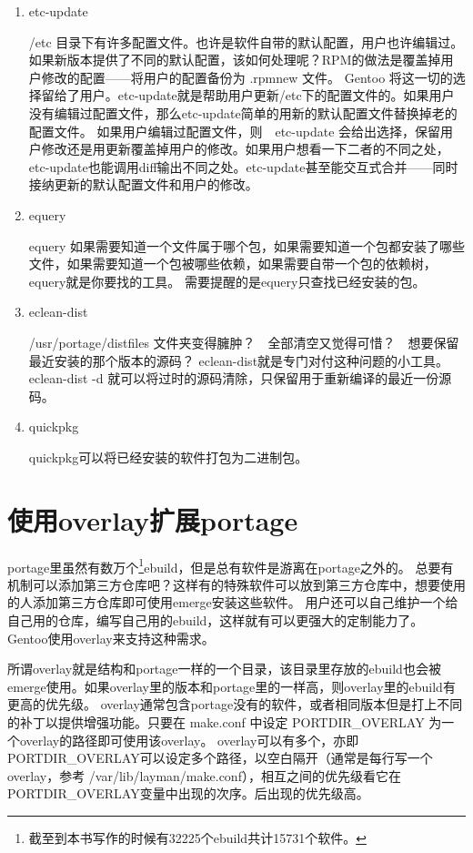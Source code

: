 \begin{enumerate}
\item  etc-update

/etc 目录下有许多配置文件。也许是软件自带的默认配置，用户也许编辑过。如果新版本提供了不同的默认配置，该如何处理呢？RPM的做法是覆盖掉用户修改的配置——将用户的配置备份为 .rpmnew 文件。
Gentoo 将这一切的选择留给了用户。etc-update就是帮助用户更新/etc下的配置文件的。如果用户没有编辑过配置文件，那么etc-update简单的用新的默认配置文件替换掉老的配置文件。
如果用户编辑过配置文件，则　etc-update 会给出选择，保留用户修改还是用更新覆盖掉用户的修改。如果用户想看一下二者的不同之处，etc-update也能调用diff输出不同之处。etc-update甚至能交互式合并——同时接纳更新的默认配置文件和用户的修改。

\item equery 

equery 如果需要知道一个文件属于哪个包，如果需要知道一个包都安装了哪些文件，如果需要知道一个包被哪些依赖，如果需要自带一个包的依赖树，equery就是你要找的工具。
需要提醒的是equery只查找已经安装的包。

\item eclean-dist

/usr/portage/distfiles 文件夹变得臃肿？　全部清空又觉得可惜？　想要保留最近安装的那个版本的源码？ eclean-dist就是专门对付这种问题的小工具。 eclean-dist -d 就可以将过时的源码清除，只保留用于重新编译的最近一份源码。

\item quickpkg

quickpkg可以将已经安装的软件打包为二进制包。

\end{enumerate}

\section{使用overlay扩展portage}\label{sec:overlay}

portage里虽然有数万个\footnote{截至到本书写作的时候有32225个ebuild共计15731个软件。}ebuild，但是总有软件是游离在portage之外的。
总要有机制可以添加第三方仓库吧？这样有的特殊软件可以放到第三方仓库中，想要使用的人添加第三方仓库即可使用emerge安装这些软件。
用户还可以自己维护一个给自己用的仓库，编写自己用的ebuild，这样就有可以更强大的定制能力了。
Gentoo使用overlay来支持这种需求。

所谓overlay就是结构和portage一样的一个目录，该目录里存放的ebuild也会被emerge使用。如果overlay里的版本和portage里的一样高，则overlay里的ebuild有更高的优先级。
overlay通常包含portage没有的软件，或者相同版本但是打上不同的补丁以提供增强功能。只要在 make.conf 中设定 PORTDIR\_OVERLAY 为一个overlay的路径即可使用该overlay。
overlay可以有多个，亦即PORTDIR\_OVERLAY可以设定多个路径，以空白隔开（通常是每行写一个overlay，参考 /var/lib/layman/make.conf），相互之间的优先级看它在PORTDIR\_OVERLAY变量中出现的次序。后出现的优先级高。

